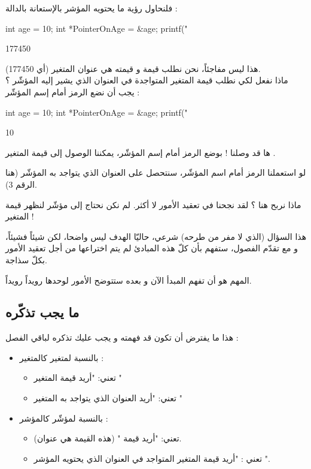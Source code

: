 فلنحاول رؤية ما يحتويه المؤشر بالإستعانة بالدالة
 :
\begin{Csource}
int age = 10;
int *PointerOnAge = &age;
printf("%
\end{Csource}
\begin{Console}
177450
\end{Console}
هذا ليس مفاجئاً، نحن نطلب قيمة
و قيمته هي عنوان المتغير
(أي 177450).\\
ماذا نفعل لكي نطلب قيمة المتغير المتواجدة في العنوان الذي يشير إليه المؤشّر
؟ يجب أن نضع الرمز
\InlineCode{*}
أمام إسم المؤشّر :
\begin{Csource}
int age = 10;
int *PointerOnAge = &age;
printf("%
\end{Csource}
\begin{Console}
10
\end{Console}
ها قد وصلنا ! بوضع الرمز
\InlineCode{*}
أمام إسم المؤشّر، يمكننا الوصول إلى قيمة المتغير
.

لو استعملنا الرمز
\InlineCode{\&}
أمام اسم المؤشّر، سنتحصل على العنوان الذي يتواجد به المؤشّر (هنا الرقم 3).

\begin{question}
	ماذا نربح هنا ؟ لقد نجحنا في تعقيد الأمور لا أكثر. لم نكن نحتاج إلى مؤشّر لنظهر قيمة المتغير
 !
\end{question}

هذا السؤال (الذي لا مفر من طرحه) شرعي، حاليّا الهدف ليس واضحا، لكن شيئاً فشيئاً، و مع تقدّم الفصول، ستفهم بأن كلّ هذه المبادئ لم يتم اختراعها من أجل تعقيد الأمور بكلّ سذاجة.

المهم هو أن تفهم المبدأ الآن و بعده ستتوضح الأمور لوحدها رويداً رويداً.

\subsection{ما يجب تذكّره}

هذا ما يفترض أن تكون قد فهمته و يجب عليك تذكره لباقي الفصل :

\begin{itemize}
	\item بالنسبة لمتغير كالمتغير
 :
	\begin{itemize}
		\item {} تعني: "أريد قيمة المتغير
"
		\item {}
تعني: "أريد العنوان الذي يتواجد به المتغير
"
	\end{itemize}
	\item بالنسبة لمؤشّر كالمؤشر
 :
	\begin{itemize}
		\item {}
تعني: "أريد قيمة
"
(هذه القيمة هي عنوان).
		\item {}
تعني : "أريد قيمة المتغير المتواجد في العنوان الذي يحتويه المؤشر
".
	\end{itemize}
\end{itemize}


